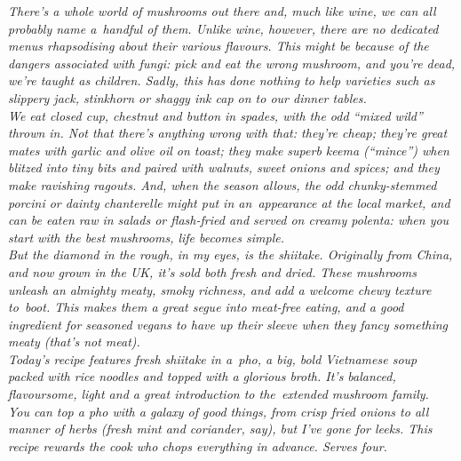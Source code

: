 \documentclass{book}
\begin{document}
\emph{There’s a whole world of mushrooms out there and, much like wine, we can all probably name a handful of them. Unlike wine, however, there are no dedicated menus rhapsodising about their various flavours. This might be because of the dangers associated with fungi: pick and eat the wrong mushroom, and you’re dead, we’re taught as children. Sadly, this has done nothing to help varieties such as slippery jack, stinkhorn or shaggy ink cap on to our dinner tables.\\ 
We eat closed cup, chestnut and button in spades, with the odd “mixed wild” thrown in. Not that there’s anything wrong with that: they’re cheap; they’re great mates with garlic and olive oil on toast; they make superb keema (“mince”) when blitzed into tiny bits and paired with walnuts, sweet onions and spices; and they make ravishing ragouts. And, when the season allows, the odd chunky-stemmed porcini or dainty chanterelle might put in an appearance at the local market, and can be eaten raw in salads or flash-fried and served on creamy polenta: when you start with the best mushrooms, life becomes simple.\\ 
But the diamond in the rough, in my eyes, is the shiitake. Originally from China, and now grown in the UK, it’s sold both fresh and dried. These mushrooms unleash an almighty meaty, smoky richness, and add a welcome chewy texture to boot. This makes them a great segue into meat-free eating, and a good ingredient for seasoned vegans to have up their sleeve when they fancy something meaty (that’s not meat).\\ 
Today’s recipe features fresh shiitake in a pho, a big, bold Vietnamese soup packed with rice noodles and topped with a glorious broth. It’s balanced, flavoursome, light and a great introduction to the extended mushroom family.\\ 
You can top a pho with a galaxy of good things, from crisp fried onions to all manner of herbs (fresh mint and coriander, say), but I’ve gone for leeks. This recipe rewards the cook who chops everything in advance. Serves four.}\\\\ 
\end{document}
